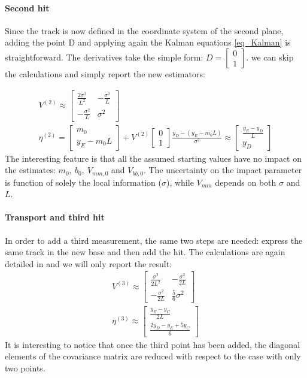 \paragraph{Second hit} 
Since the track is now defined in the coordinate system of the second plane, 
adding the point D and applying again the Kalman equations \ref{eq_Kalman} is straightforward. 
The derivatives take the simple form: $D=\begin{bmatrix}0\\1\end{bmatrix}$. 
we can skip the calculations and simply report the new estimators:

\begin{equation}
\begin{gathered}
V^{(2)}\approx
\begin{bmatrix}
\frac{2\sigma^2}{L^2} & -\frac{\sigma^2}{L} \\
-\frac{\sigma^2}{L} & \sigma^2
\end{bmatrix}\\
\eta^{(2)} = 
\begin{bmatrix} m_0 \\  y_E-m_0L \end{bmatrix} +
V^{(2)}
\begin{bmatrix} 0\\1 \end{bmatrix}
\frac{y_D-(y_E-m_0L)}{\sigma^2} \approx
\begin{bmatrix} \frac{y_E-y_D}{L} \\ y_D\end{bmatrix}
\end{gathered}
\label{eq_V2}
\end{equation}
The interesting feature is that all the assumed starting values have no impact on the estimates: $m_0,\ b_0,\ V_{mm,0}$ and $V_{bb,0}$. 
The uncertainty on the impact parameter is function of solely the local information ($\sigma$), 
while $V_{mm}$ depends on both $\sigma$ and $L$. 

\paragraph{Transport and third hit} 
In order to add a third measurement, 
the same two steps are needed: 
express the same track in the new base and then add the hit. 
The calculations are again detailed in \cite{KutschkePaper} and we will only report the result:
\begin{gather*}
V^{(3)}\approx
\begin{bmatrix}
\frac{\sigma^2}{2L^2} & -\frac{\sigma^2}{2L} \\
-\frac{\sigma^2}{2L} & \frac{5}{6}\sigma^2
\end{bmatrix}\\
\eta^{(3)} \approx
\begin{bmatrix} \frac{y_E-y_C}{2L} \\ \frac{2y_D-y_E+5y_C}{6}
\end{bmatrix}
\end{gather*}
It is interesting to notice that once the third point has been added, 
the diagonal elements of the covariance matrix are reduced with respect to the case with only two points. 

